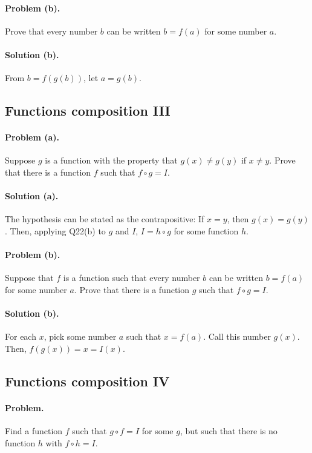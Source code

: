 \documentclass{article}
\begin{document}
\paragraph{Problem (b).} Prove that every number $b$ can be written $b = f(a)$
for some number $a$.

\paragraph{Solution (b).} From $b = f(g(b))$, let $a = g(b)$.

\setcounter{subsection}{23}
\subsection{Functions composition III}

\paragraph{Problem (a).} Suppose $g$ is a function with the property that $g(x)
\neq g(y)$ if $x \neq y$. Prove that there is a function $f$ such that $f \circ
g = I$.

\paragraph{Solution (a).} The hypothesis can be stated as the contrapositive:
If $x = y$, then $g(x) = g(y)$. Then, applying Q22(b) to $g$ and $I$, $I = h
\circ g$ for some function $h$.

\paragraph{Problem (b).} Suppose that $f$ is a function such that every number
$b$ can be written $b = f(a)$ for some number $a$. Prove that there is a
function $g$ such that $f \circ g = I$.

\paragraph{Solution (b).} For each $x$, pick some number $a$ such that $x =
f(a)$. Call this number $g(x)$. Then, $f(g(x)) = x = I(x)$.

\setcounter{subsection}{24}
\subsection{Functions composition IV}

\paragraph{Problem.} Find a function $f$ such that $g \circ f = I$ for some
$g$, but such that there is no function $h$ with $f \circ h = I$.
\end{document}
